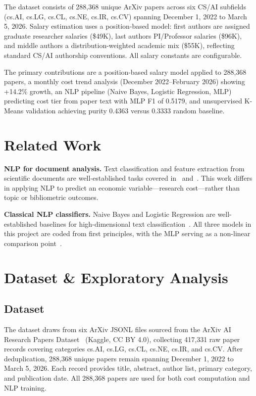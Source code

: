 \documentclass{article}
\begin{document}
The dataset consists of 288,368 unique ArXiv papers across six CS/AI subfields (cs.AI, cs.LG, cs.CL, cs.NE, cs.IR, cs.CV) spanning December 1, 2022 to March 5, 2026. Salary estimation uses a position-based model: first authors are assigned graduate researcher salaries (\$49K), last authors PI/Professor salaries (\$96K), and middle authors a distribution-weighted academic mix (\$55K), reflecting standard CS/AI authorship conventions. All salary constants are configurable.

The primary contributions are a position-based salary model applied to 288,368 papers, a monthly cost trend analysis (December 2022--February 2026) showing +14.2\% growth, an NLP pipeline (Naive Bayes, Logistic Regression, MLP) predicting cost tier from paper text with MLP F1 of 0.5179, and unsupervised K-Means validation achieving purity 0.4363 versus 0.3333 random baseline.

\section{Related Work}

\textbf{NLP for document analysis.}
Text classification and feature extraction from scientific documents are well-established tasks covered in~\cite{vanderplalas2023} and~\cite{learningds2023}. This work differs in applying NLP to predict an economic variable---research cost---rather than topic or bibliometric outcomes.

\textbf{Classical NLP classifiers.}
Naive Bayes and Logistic Regression are well-established baselines for high-dimensional text classification~\cite{princetondml, vanderplalas2023, mckinney2022}. All three models in this project are coded from first principles, with the MLP serving as a non-linear comparison point~\cite{princetondml}.

\section{Dataset \& Exploratory Analysis}

\subsection{Dataset}

The dataset draws from six ArXiv JSONL files sourced from the ArXiv AI Research Papers Dataset~\cite{haddii2024} (Kaggle, CC BY 4.0), collecting 417,331 raw paper records covering categories cs.AI, cs.LG, cs.CL, cs.NE, cs.IR, and cs.CV. After deduplication, 288,368 unique papers remain spanning December 1, 2022 to March 5, 2026. Each record provides title, abstract, author list, primary category, and publication date. All 288,368 papers are used for both cost computation and NLP training.
\end{document}
